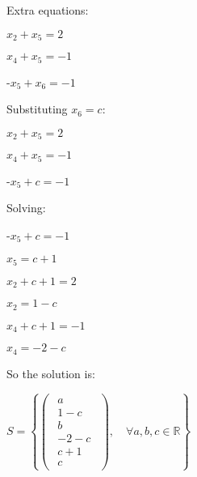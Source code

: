 \singlespacing

Extra equations:

\singlespacing

$x_2 + x_5 = 2$

$x_4 + x_5 = -1$

-$x_5 + x_6 = -1$

\singlespacing

Substituting $x_6 = c$:

\singlespacing

$x_2 + x_5 = 2$

$x_4 + x_5 = -1$

-$x_5 + c = -1$

\singlespacing

Solving:

\singlespacing

-$x_5 + c = -1$

$x_5 = c + 1$

\singlespacing

$x_2 + c + 1 = 2$

$x_2 = 1 - c$

\singlespacing

$x_4 + c + 1 = -1$

$x_4 = -2 - c$

\singlespacing

So the solution is:

\singlespacing

\begin{math}
    S = \left\{
    \begin{pmatrix}
        \begin{array}{c}
            a      \\
            1 - c  \\
            b      \\
            -2 - c \\
            c + 1  \\
            c
        \end{array}
    \end{pmatrix},\quad
    \forall a, b, c \in \mathbb{R}
    \right\}
\end{math}
